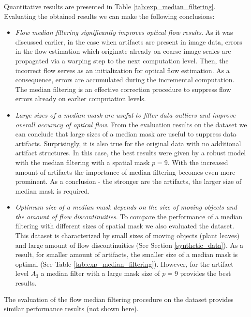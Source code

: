    
Quantitative results are presented in Table \ref{tab:exp_median_filtering}.
Evaluating the obtained results we can make the following conclusions:
\begin{itemize}
	\item \textit{Flow median filtering significantly improves optical flow results}.  As it was discussed earlier, in the case when artifacts are present in image data, errors in the flow estimation which originate already on coarse image scales are propagated via a warping step to the next computation level. Then, the incorrect flow serves as an initialization for optical flow estimation.  As a consequence, errors are accumulated during the incremental computation. The median filtering is an effective correction procedure to suppress flow errors already on earlier computation levels. 
	
	\item \textit{Large sizes of a median mask are useful to filter data outliers and improve overall accuracy of optical flow}. From the evaluation results on the \rub dataset we can conclude that large sizes of a median mask are useful to suppress data artifacts.   Surprisingly, it is also true for the original data with no additional artifact structures. In this case, the best results were given by a robust model with the median filtering with a spatial mask $p=9$.  With the increased amount of artifacts the importance of median filtering becomes even more prominent. As a conclusion - the stronger are the artifacts, the larger size of median mask is required.

	\item \textit{Optimum size of a median mask depends on the size of moving objects and the amount of flow discontinuities}. To compare the performance of a median filtering with different sizes of spatial mask we also evaluated the \hyd dataset. This dataset is characterized by small sizes of moving objects (plant leaves) and large amount of flow discontinuities (See Section \ref{synthetic_data}). As a result, for smaller amount of artifacts, the smaller size of a median mask is optimal (See Table \ref{tab:exp_median_filtering}). However, for the artifact level $A_3$ a median filter with a large mask size of $p=9$ provides the best results.
\end{itemize}

The evaluation of the flow median filtering procedure on the \mar dataset provides similar performance results (not shown here).







